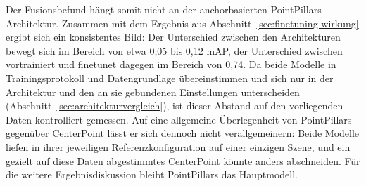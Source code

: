 Der Fusionsbefund hängt somit nicht an der anchorbasierten PointPillars-Architektur. Zusammen mit dem Ergebnis aus Abschnitt~\ref{sec:finetuning-wirkung} ergibt sich ein konsistentes Bild: Der Unterschied zwischen den Architekturen bewegt sich im Bereich von etwa 0{,}05 bis 0{,}12 mAP, der Unterschied zwischen vortrainiert und finetunet dagegen im Bereich von 0{,}74. Da beide Modelle in Trainingsprotokoll und Datengrundlage übereinstimmen und sich nur in der Architektur und den an sie gebundenen Einstellungen unterscheiden (Abschnitt~\ref{sec:architekturvergleich}), ist dieser Abstand auf den vorliegenden Daten kontrolliert gemessen. Auf eine allgemeine Überlegenheit von PointPillars gegenüber CenterPoint lässt er sich dennoch nicht verallgemeinern: Beide Modelle liefen in ihrer jeweiligen Referenzkonfiguration auf einer einzigen Szene, und ein gezielt auf diese Daten abgestimmtes CenterPoint könnte anders abschneiden. Für die weitere Ergebnisdiskussion bleibt PointPillars das Hauptmodell.
